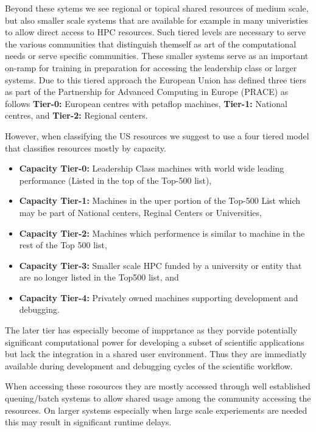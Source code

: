 \documentclass[utf8]{FrontiersinVancouver} %
\begin{document}
Beyond these sytems we see regional or topical shared resources of
medium scale, but also smaller scale systems that are available for
example in many univeristies to allow direct access to HPC 
resources. Such tiered levels are necessary to serve the various
communities that distinguish themself as art of the computational
needs or serve specific communities. These smaller systems serve as an
important on-ramp for training in preparation for accessing the
leadership class or larger systems.
Due to this tiered approach the European Union has defined three tiers as part of the
Partnership for Advanced Computing in Europe (PRACE) as follows
{\bf Tier-0:} European centres with petaflop machines,
{\bf Tier-1:} National centres, and
{\bf Tier-2:} Regional centers.
  
However, when classifying the US resources we suggest to use a four
tiered model that classifies resources mostly by capacity.

\begin{itemize}
\item {\bf Capacity Tier-0:} Leadership Class machines with world wide leading
  performance (Listed in the top of the Top-500 list),
\item {\bf Capacity Tier-1:} Machines in the uper portion of the Top-500 List which may be part of
  National centers, Reginal Centers  or Universities, 
\item {\bf Capacity Tier-2:} Machines which performence is similar to machine
  in the rest of the Top 500 list,
\item {\bf Capacity Tier-3:} Smaller scale HPC funded by a university or entity
  that are no longer listed in the Top500 list, and 
\item {\bf Capacity Tier-4:} Privately owned machines supporting development
  and debugging.
  
\end{itemize}

The later tier has especially become of impprtance as they porvide potentially
significant computational power for developing a subset of scientific
applications but lack the integration in a shared
user environment. Thus they are immediatly available during development
and debugging cycles of the scientific workflow.

When accessing these rosources they are mostly accessed through well
established queuing/batch systems to allow shared usage among the
community accessing the resources. On larger systems especially when
large scale experiements are needed this may result in significant
runtime delays.
\end{document}
